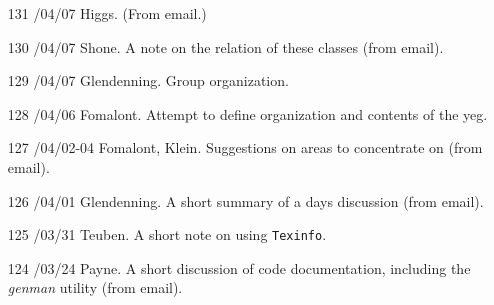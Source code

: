 \begin{enumerate}
\item[131]
/04/07 Higgs.
\linebreak  (From email.)

\item[130]
/04/07 Shone.
\linebreak  A note on the relation of these classes (from email).

\item[129]
/04/07 Glendenning.
\linebreak  Group organization.

\item[128]
/04/06 Fomalont.
\linebreak  Attempt to define organization and contents of the yeg.

\item[127]
/04/02-04 Fomalont, Klein.
\linebreak  Suggestions on areas to concentrate on (from email).

\item[126]
/04/01 Glendenning.
\linebreak  A short summary of a days discussion (from email).

\item[125]
/03/31 Teuben.
\linebreak  A short note on using \texttt{Texinfo}.

\item[124]
/03/24 Payne.
\linebreak  A short discussion of code documentation, including the \textit{genman}
   utility (from email).


\end{enumerate}
